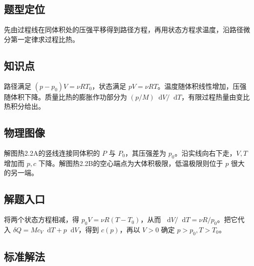 \documentclass[UTF8,fontset=fandol,a4paper,11pt]{ctexart}
\newcommand{\dd}{\mathop{}\!\mathrm{d}}
\begin{document}

\subsection*{题型定位}

先由过程线在同体积处的压强平移得到路径方程，再用状态方程求温度，沿路径微分第一定律求过程比热。



\subsection*{知识点}

路径满足 $(p-p_0)V=\nu RT_0$，状态满足 $pV=\nu RT$。温度随体积线性增加，压强随体积下降。质量比热的膨胀作功部分为 $(p/M)\dd V/\dd T$，有限过程热量由变比热积分给出。




\subsection*{物理图像}

解图热2.2A的竖线连接同体积的 $P$ 与 $P_0$，其压强差为 $p_0$。沿实线向右下走，$V,T$ 增加而 $p,c$ 下降。解图热2.2B的空心端点为大体积极限，低温极限则位于 $p$ 很大的另一端。



\subsection*{解题入口}

将两个状态方程相减，得 $p_0V=\nu R(T-T_0)$，从而 $\dd V/\dd T=\nu R/p_0$。把它代入 $\delta Q=Mc_V\dd T+p\dd V$，得到 $c(p)$，再以 $V>0$ 确定 $p>p_0,T>T_0$。




\subsection*{标准解法}
\end{document}
